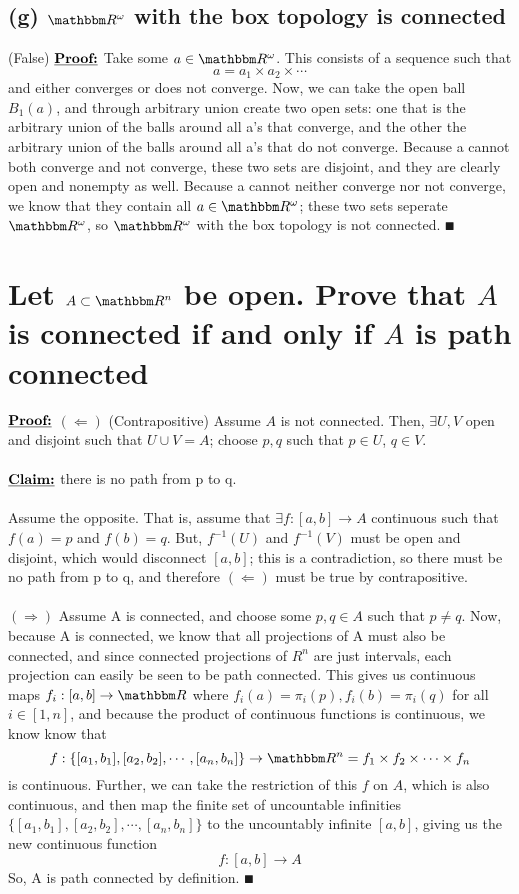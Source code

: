 \documentclass{article}
\begin{document}
\subsection*{(g) $\R^\omega$ with the box topology is connected}
(False) $\textbf{\underline{Proof:}}$ Take some $a \in \R^\omega$. This consists of a sequence such that
$$a = a_1 \times a_2 \times \cdots $$
and either converges or does not converge. Now, we can take the open ball $B_1(a)$, and through arbitrary union create two open sets: one that is the arbitrary union of the balls around all a's that converge, and the other the arbitrary union of the balls around all a's that do not converge. Because a cannot both converge and not converge, these two sets are disjoint, and they are clearly open and nonempty as well. Because a cannot neither converge nor not converge, we know that they contain all $a \in \R^\omega$; these two sets seperate $\R^\omega$, so $\R^\omega$ with the box topology is not connected. $\QED$

\section{Let $A \subset \R^n$ be open. Prove that $A$ is connected if and only if $A$ is path connected}
$\textbf{\underline{Proof:}}$ $(\Leftarrow)$ (Contrapositive) Assume $A$ is not connected. Then, $\exists U, V$ open and disjoint such that $U \cup V = A$; choose $p, q$ such that $p \in U$, $q \in V$. \\ \\
$\textbf{\underline{Claim:}}$ there is no path from p to q. \\ \\
Assume the opposite. That is, assume that $\exists f: [a, b] \rightarrow A$ continuous such that $f(a) = p$ and $f(b) = q$. But, $f^{-1}(U)$ and $f^{-1}(V)$ must be open and disjoint, which would disconnect $[a, b]$; this is a contradiction, so there must be no path from p to q, and therefore $(\Leftarrow)$ must be true by contrapositive. \\ \\
$(\Rightarrow)$ Assume A is connected, and choose some $p, q \in A$ such that $p \neq q$. Now, because A is connected, we know that all projections of A must also be connected, and since connected projections of $R^n$ are just intervals, each projection can easily be seen to be path connected. This gives us continuous maps $f_i : [a, b] \rightarrow \R$ where $f_i(a) = \pi_i(p), f_i(b) = \pi_i(q)$ for all $i \in [1, n]$, and because the product of continuous functions is continuous, we know know that 
$$f : \{[a_1, b_1], [a_2, b_2], \cdots, [a_n, b_n]\} \rightarrow \R^n= f_1 \times f_2 \times \cdots \times f_n$$
is continuous. Further, we can take the restriction of this $f$ on $A$, which is also continuous, and then map the finite set of uncountable infinities $\{[a_1, b_1], [a_2, b_2], \cdots, [a_n, b_n]\}$ to the uncountably infinite $[a, b]$, giving us the new continuous function
$$f : [a, b] \rightarrow A$$
So, A is path connected by definition. $\QED$
\end{document}
